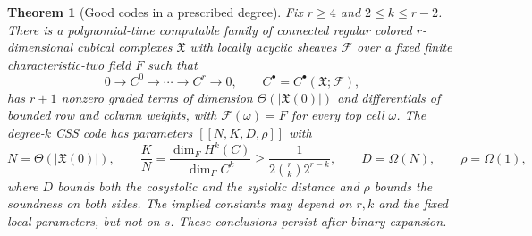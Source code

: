\documentclass[11pt,letterpaper]{article}
\renewcommand{\le}{\leqslant}
\renewcommand{\ge}{\geqslant}
\newtheorem{theorem}{Theorem}[section]
\theoremstyle{definition}
\theoremstyle{remark}
\newcommand{\cF}{\mathcal F}
\newcommand{\X}{\mathfrak{X}}
\begin{document}
\begin{theorem}[Good codes in a prescribed degree]
\label{thm:prescribed-degree}
Fix $r\ge4$ and $2\le k\le r-2$. There is a polynomial-time computable
family of connected regular colored $r$-dimensional cubical complexes
$\X$ with locally acyclic sheaves $\cF$ over a
fixed finite characteristic-two field $F$ such that
\[
 0\longrightarrow C^0\longrightarrow\cdots
 \longrightarrow C^r\longrightarrow0,
 \qquad C^\bullet=C^\bullet(\X;\cF),
\]
has $r+1$ nonzero graded terms of dimension $\Theta(|\X(0)|)$
and differentials of bounded row and column weights, with
$\cF(\omega)=F$ for every top cell $\omega$.
The degree-$k$ CSS code has parameters $[[N,K,D,\rho]]$ with
\begin{equation}
 N=\Theta(|\X(0)|),\qquad
 \frac KN=\frac{\dim_F H^k(C)}{\dim_F C^k}
 \ge\frac1{2\binom rk2^{r-k}},\qquad
 D=\Omega(N),\qquad \rho=\Omega(1),
 \label{eq:prescribed-rate}
\end{equation}
where $D$ bounds both the cosystolic and the systolic distance and
$\rho$ bounds the soundness on both sides. The implied constants may
depend on $r,k$ and the fixed local parameters, but not on $s$. These
conclusions persist after binary expansion.
\end{theorem}
\end{document}
